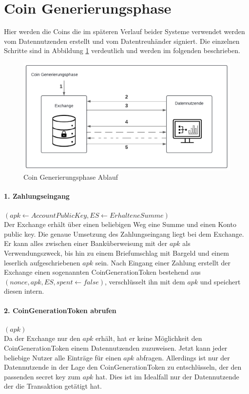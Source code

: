 \documentclass[11pt,a4paper]{scrreprt}
\begin{document}
\section{Coin Generierungsphase}
Hier werden die Coins die im späteren Verlauf beider Systeme verwendet werden vom Datennutzenden erstellt und vom Datentreuhänder signiert. Die einzelnen Schritte sind in Abbildung \ref{fig:coin-generationphase} verdeutlich und werden im folgenden beschrieben.
\begin{figure}[H]
    \centering
    \includegraphics[width=0.9\linewidth]{CoinGenerationPhaseDiagramm.pdf}
    \caption{Coin Generierungsphase Ablauf}
    \label{fig:coin-generationphase}
\end{figure}

\paragraph{1. Zahlungseingang} $(apk \leftarrow AccountPublicKey, ES \leftarrow ErhalteneSumme)$\\
Der Exchange erhält über einen beliebigen Weg eine Summe und einen Konto public key. Die genaue Umsetzung des Zahlungseingang liegt bei dem Exchange. Er kann alles zwischen einer Banküberweisung mit der $apk$ als Verwendungszweck, bis hin zu einem Briefumschlag mit Bargeld und einem leserlich aufgeschriebenen $apk$ sein. Nach Eingang einer Zahlung erstellt der Exchange einen sogenannten CoinGenerationToken bestehend aus $(nonce, apk, ES, spent \leftarrow false)$, verschlüsselt ihn mit dem $apk$ und speichert diesen intern.

\paragraph{2. CoinGenerationToken abrufen} $(apk)$\\
Da der Exchange nur den $apk$ erhält, hat er keine Möglichkeit den CoinGenerationToken einem Datennutzenden zuzuweisen. Jetzt kann jeder beliebige Nutzer alle Einträge für einen $apk$ abfragen. Allerdings ist nur der Datennutzende in der Lage den CoinGenerationToken zu entschlüsseln, der den passenden secret key zum $apk$ hat. Dies ist im Idealfall nur der Datennutzende der die Transaktion getätigt hat.
\end{document}
